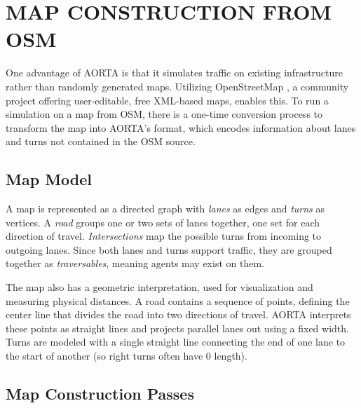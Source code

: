 \documentclass[letterpaper, 10 pt, conference]{ieeeconf}  %
\begin{document}

\section{MAP CONSTRUCTION FROM OSM}
\label{sec:map}

One advantage of AORTA is that it simulates traffic on existing infrastructure
rather than randomly generated maps. Utilizing OpenStreetMap \cite{osm}, a
community project offering user-editable, free XML-based maps, enables this. To
run a simulation on a map from OSM, there is a one-time conversion process to
transform the map into AORTA's format, which encodes information about lanes and
turns not contained in the OSM source.

\subsection{Map Model}


A map is represented as a directed graph with \emph{lanes} as edges and
\emph{turns} as vertices. A \emph{road} groups one or two sets of lanes
together, one set for each direction of travel.
\emph{Intersections} map the possible turns from incoming to outgoing lanes.
Since both lanes and turns support traffic, they are grouped together as
\emph{traversables}, meaning agents may exist on them.

The map also has a geometric interpretation, used for visualization and
measuring physical distances. A road contains a sequence of points, defining the
center line that divides the road into two directions of travel. AORTA
interprets these points as straight lines and projects parallel lanes out using
a fixed width. Turns are modeled with a single straight line connecting the end
of one lane to the start of another (so right turns often have 0 length).

\subsection{Map Construction Passes}
\end{document}
